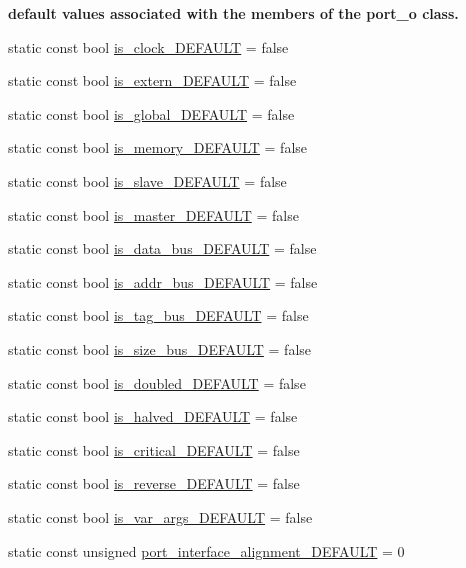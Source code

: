 \begin{Indent}\textbf{ default values associated with the members of the port\+\_\+o class.}\par
\begin{DoxyCompactItemize}
\item 
static const bool \hyperlink{structport__o_ac9568d87a28bf0f3fbc797f772cd1394}{is\+\_\+clock\+\_\+\+D\+E\+F\+A\+U\+LT} = false
\item 
static const bool \hyperlink{structport__o_a853847e2869d2d24e6649adec8501dc3}{is\+\_\+extern\+\_\+\+D\+E\+F\+A\+U\+LT} = false
\item 
static const bool \hyperlink{structport__o_a5dde0b106a5b155bbbdc82987edb0750}{is\+\_\+global\+\_\+\+D\+E\+F\+A\+U\+LT} = false
\item 
static const bool \hyperlink{structport__o_a3b12a0bcf52cf9b6ef9bf5a27a99780b}{is\+\_\+memory\+\_\+\+D\+E\+F\+A\+U\+LT} = false
\item 
static const bool \hyperlink{structport__o_a6dde83fa52a709bcac55481900d2d889}{is\+\_\+slave\+\_\+\+D\+E\+F\+A\+U\+LT} = false
\item 
static const bool \hyperlink{structport__o_a8a870d15493ad262cd6fd987eca99c14}{is\+\_\+master\+\_\+\+D\+E\+F\+A\+U\+LT} = false
\item 
static const bool \hyperlink{structport__o_a1b3708f6d2e6b61d7449c3ee389038ab}{is\+\_\+data\+\_\+bus\+\_\+\+D\+E\+F\+A\+U\+LT} = false
\item 
static const bool \hyperlink{structport__o_a22e9e48614ce96593d824beacd370b71}{is\+\_\+addr\+\_\+bus\+\_\+\+D\+E\+F\+A\+U\+LT} = false
\item 
static const bool \hyperlink{structport__o_aa5e604b60bd505030bfdd8cc62078d6a}{is\+\_\+tag\+\_\+bus\+\_\+\+D\+E\+F\+A\+U\+LT} = false
\item 
static const bool \hyperlink{structport__o_a4dd8048a6101091e8fd583e5e901a24f}{is\+\_\+size\+\_\+bus\+\_\+\+D\+E\+F\+A\+U\+LT} = false
\item 
static const bool \hyperlink{structport__o_a2cd42323769c0a18e1e0a44745336508}{is\+\_\+doubled\+\_\+\+D\+E\+F\+A\+U\+LT} = false
\item 
static const bool \hyperlink{structport__o_a8cd104eb7d1bac7c5d3ee7014e10e7ac}{is\+\_\+halved\+\_\+\+D\+E\+F\+A\+U\+LT} = false
\item 
static const bool \hyperlink{structport__o_aa8e98dc5c57b5eec0c25f578c5ff2ea6}{is\+\_\+critical\+\_\+\+D\+E\+F\+A\+U\+LT} = false
\item 
static const bool \hyperlink{structport__o_ac33dce12bcc187d131e022c88c4abf3a}{is\+\_\+reverse\+\_\+\+D\+E\+F\+A\+U\+LT} = false
\item 
static const bool \hyperlink{structport__o_a0c696eb13cf75691600e0ff9b843a4a4}{is\+\_\+var\+\_\+args\+\_\+\+D\+E\+F\+A\+U\+LT} = false
\item 
static const unsigned \hyperlink{structport__o_ab4b79782a585643db93e33d3b7dbac73}{port\+\_\+interface\+\_\+alignment\+\_\+\+D\+E\+F\+A\+U\+LT} = 0
\end{DoxyCompactItemize}
\end{Indent}
